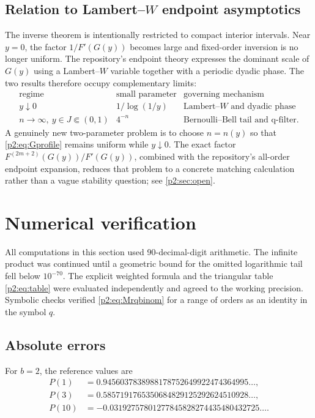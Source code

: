 \documentclass[11pt,oneside]{article}
\numberwithin{equation}{section}
\theoremstyle{definition}
\theoremstyle{remark}
\begin{document}
\subsection{Relation to \texorpdfstring{Lambert--\(W\)}{Lambert-W} endpoint asymptotics}

The inverse theorem is intentionally restricted to compact interior intervals.
Near \(y=0\), the factor \(1/F'(G(y))\) becomes large and fixed-order inversion
is no longer uniform. The repository's endpoint theory expresses the dominant
scale of \(G(y)\) using a Lambert--\(W\) variable together with a periodic dyadic
phase. The two results therefore occupy complementary limits:
\[
 \begin{array}{c|c|c}
 \text{regime}&\text{small parameter}&\text{governing mechanism}\\ \hline
 y\downarrow0 & 1/\log(1/y) & \text{Lambert--}W\text{ and dyadic phase}\\
 n\to\infty,\ y\in J\Subset(0,1)&4^{-n}&\text{Bernoulli--Bell tail and q-filter}.
 \end{array}
\]
A genuinely new two-parameter problem is to choose \(n=n(y)\) so that
\eqref{p2:eq:Gprofile} remains uniform while \(y\downarrow0\). The exact factor
\(F^{(2m+2)}(G(y))/F'(G(y))\), combined with the repository's all-order endpoint
expansion, reduces that problem to a concrete matching calculation rather than a
vague stability question; see \cref{p2:sec:open}.

\section{Numerical verification}
\label{p2:sec:numerics}

All computations in this section used 90-decimal-digit arithmetic. The infinite
product was continued until a geometric bound for the omitted logarithmic tail
fell below \(10^{-70}\). The explicit weighted formula and the triangular table
\eqref{p2:eq:table} were evaluated independently and agreed to the working
precision. Symbolic checks verified \eqref{p2:eq:Mrqbinom} for a range of orders as
an identity in the symbol \(q\).

\subsection{Absolute errors}

For \(b=2\), the reference values are
\begin{align*}
 P(1)&=0.9456037838988178752649922474364995\ldots,\\
 P(3)&=0.5857191765350684829125292624510928\ldots,\\
 P(10)&=-0.03192757801277845828274435480432725\ldots.
\end{align*}
\end{document}

